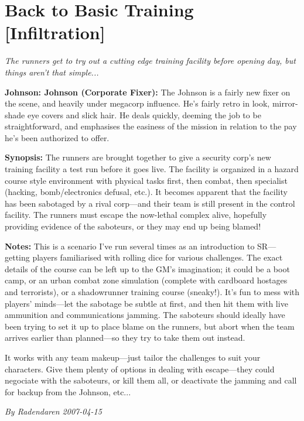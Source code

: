 \documentclass[letterpaper,twocolumn,10.5pt]{article}
\newenvironment{scenario}[6]
	{
		\section{#1 {\small[#2]}}
		\textit{#3}
		\def\TMPSCENARIO{#4 #5}
	}
	{\small\textit{By \TMPSCENARIO}}
\newcommand{\johnson}[2]{\textbf{Johnson: #1 (#2):}}
\newcommand{\synopsis}{\textbf{Synopsis: }}
\newcommand{\notes}{\textbf{Notes: }}
\begin{document}
\begin{scenario}{ Back to Basic Training}
	{Infiltration}
	{The runners get to try out a cutting edge training facility before opening day, but things aren't that simple...}
	{Radendaren}
	{2007-04-15}
	{https://forum.rpg.net/showthread.php?321504-Shadowrun-4th-101-Instant-Scenarios\&p=7172047#post7172047}

\johnson{Johnson}{Corporate Fixer} The Johnson is a fairly new fixer on the scene, and heavily under megacorp influence. He's fairly retro in look, mirror-shade eye covers and slick hair. He deals quickly, deeming the job to be straightforward, and emphasises the easiness of the mission in relation to the pay he's been authorized to offer.

\synopsis The runners are brought together to give a security corp's new training facility a test run before it goes live. The facility is organized in a hazard course style environment with physical tasks first, then combat, then specialist (hacking, bomb/electronics defusal, etc.). It becomes apparent that the facility has been sabotaged by a rival corp---and their team is still present in the control facility. The runners must escape the now-lethal complex alive, hopefully providing evidence of the saboteurs, or they may end up being blamed!

\notes This is a scenario I've run several times as an introduction to SR---getting players familiarised with rolling dice for various challenges. The exact details of the course can be left up to the GM's imagination; it could be a boot camp, or an urban combat zone simulation (complete with cardboard hostages and terrorists), or a shadowrunner training course (sneaky!). It's fun to mess with players' minds---let the sabotage be subtle at first, and then hit them with live ammunition and communications jamming. The saboteurs should ideally have been trying to set it up to place blame on the runners, but abort when the team arrives earlier than planned---so they try to take them out instead.

It works with any team makeup---just tailor the challenges to suit your characters. Give them plenty of options in dealing with escape---they could negociate with the saboteurs, or kill them all, or deactivate the jamming and call for backup from the Johnson, etc... 

\end{scenario}
\end{document}
